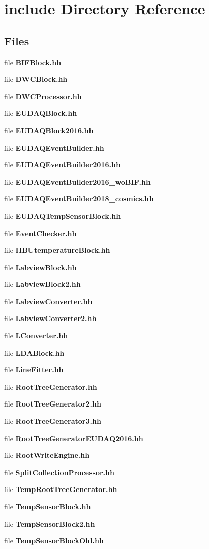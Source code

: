\section{include Directory Reference}
\label{dir_8a765ffcc5fb4f0680e0eb362417c1ab}
\subsection*{Files}
\begin{DoxyCompactItemize}
\item 
file {\bfseries B\-I\-F\-Block.\-hh}
\item 
file {\bfseries D\-W\-C\-Block.\-hh}
\item 
file {\bfseries D\-W\-C\-Processor.\-hh}
\item 
file {\bfseries E\-U\-D\-A\-Q\-Block.\-hh}
\item 
file {\bfseries E\-U\-D\-A\-Q\-Block2016.\-hh}
\item 
file {\bfseries E\-U\-D\-A\-Q\-Event\-Builder.\-hh}
\item 
file {\bfseries E\-U\-D\-A\-Q\-Event\-Builder2016.\-hh}
\item 
file {\bfseries E\-U\-D\-A\-Q\-Event\-Builder2016\-\_\-wo\-B\-I\-F.\-hh}
\item 
file {\bfseries E\-U\-D\-A\-Q\-Event\-Builder2018\-\_\-cosmics.\-hh}
\item 
file {\bfseries E\-U\-D\-A\-Q\-Temp\-Sensor\-Block.\-hh}
\item 
file {\bfseries Event\-Checker.\-hh}
\item 
file {\bfseries H\-B\-Utemperature\-Block.\-hh}
\item 
file {\bfseries Labview\-Block.\-hh}
\item 
file {\bfseries Labview\-Block2.\-hh}
\item 
file {\bfseries Labview\-Converter.\-hh}
\item 
file {\bfseries Labview\-Converter2.\-hh}
\item 
file {\bfseries L\-Converter.\-hh}
\item 
file {\bfseries L\-D\-A\-Block.\-hh}
\item 
file {\bfseries Line\-Fitter.\-hh}
\item 
file {\bfseries Root\-Tree\-Generator.\-hh}
\item 
file {\bfseries Root\-Tree\-Generator2.\-hh}
\item 
file {\bfseries Root\-Tree\-Generator3.\-hh}
\item 
file {\bfseries Root\-Tree\-Generator\-E\-U\-D\-A\-Q2016.\-hh}
\item 
file {\bfseries Root\-Write\-Engine.\-hh}
\item 
file {\bfseries Split\-Collection\-Processor.\-hh}
\item 
file {\bfseries Temp\-Root\-Tree\-Generator.\-hh}
\item 
file {\bfseries Temp\-Sensor\-Block.\-hh}
\item 
file {\bfseries Temp\-Sensor\-Block2.\-hh}
\item 
file {\bfseries Temp\-Sensor\-Block\-Old.\-hh}
\end{DoxyCompactItemize}
